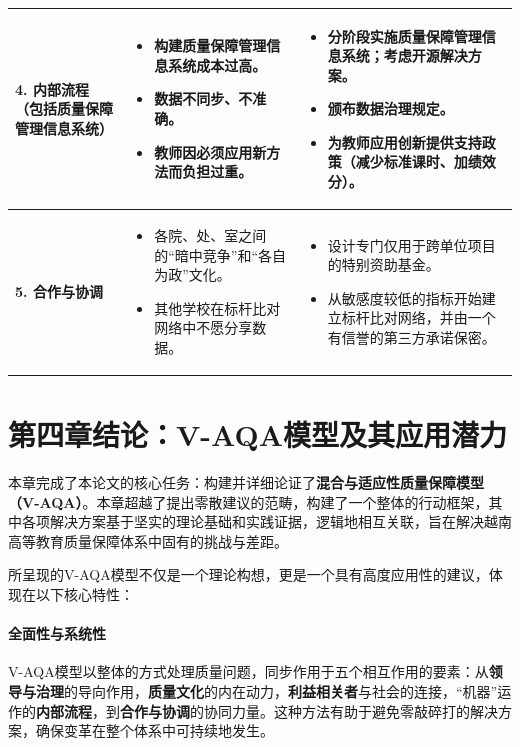 \begin{longtable}{|p{3cm}|p{5.5cm}|p{6cm}|}
\textbf{4. 内部流程（包括质量保障管理信息系统）} & 
\begin{itemize}
    \item 构建质量保障管理信息系统成本过高。
    \item 数据不同步、不准确。
    \item 教师因必须应用新方法而负担过重。
\end{itemize} & 
\begin{itemize}
    \item 分阶段实施质量保障管理信息系统；考虑开源解决方案。
    \item 颁布数据治理规定。
    \item 为教师应用创新提供支持政策（减少标准课时、加绩效分）。
\end{itemize} \\
\hline

\textbf{5. 合作与协调} & 
\begin{itemize}
    \item 各院、处、室之间的“暗中竞争”和“各自为政”文化。
    \item 其他学校在标杆比对网络中不愿分享数据。
\end{itemize} & 
\begin{itemize}
    \item 设计专门仅用于跨单位项目的特别资助基金。
    \item 从敏感度较低的指标开始建立标杆比对网络，并由一个有信誉的第三方承诺保密。
\end{itemize} \\
\end{longtable}



\section*{第四章结论：V-AQA模型及其应用潜力}

本章完成了本论文的核心任务：构建并详细论证了\textbf{混合与适应性质量保障模型（V-AQA）}。本章超越了提出零散建议的范畴，构建了一个整体的行动框架，其中各项解决方案基于坚实的理论基础和实践证据，逻辑地相互关联，旨在解决越南高等教育质量保障体系中固有的挑战与差距。

所呈现的V-AQA模型不仅是一个理论构想，更是一个具有高度应用性的建议，体现在以下核心特性：

\paragraph{全面性与系统性}
V-AQA模型以整体的方式处理质量问题，同步作用于五个相互作用的要素：从\textbf{领导与治理}的导向作用，\textbf{质量文化}的内在动力，\textbf{利益相关者}与社会的连接，“机器”运作的\textbf{内部流程}，到\textbf{合作与协调}的协同力量。这种方法有助于避免零敲碎打的解决方案，确保变革在整个体系中可持续地发生。

